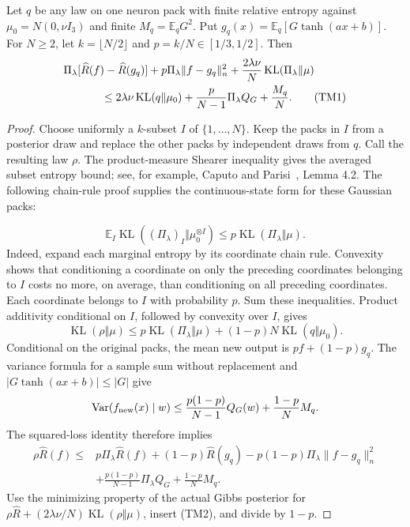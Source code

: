 \begin{lemma}
\label{lem:tanh-subset-midpoint}
Let $q$ be any law on one neuron pack with finite relative entropy
against $\mu_0=N(0,\nu I_3)$ and finite $M_q=\mathbb E_qG^2$.
Put $g_q(x)=\mathbb E_q[G\tanh(ax+b)]$. For $N\ge2$, let
$k=\lfloor N/2\rfloor$ and $p=k/N\in[1/3,1/2]$. Then
\begin{align}
 &\Pi_\lambda[\widehat R(f)-\widehat R(g_q)]
 +p\Pi_\lambda\|f-g_q\|_n^2
 +\frac{2\lambda\nu}{N}\operatorname{KL}(\Pi_\lambda\Vert\mu)
 \nonumber\\
 &\hspace{12mm}\le
 2\lambda\nu\operatorname{KL}(q\Vert\mu_0)
 +\frac{p}{N-1}\Pi_\lambda Q_G+\frac{M_q}{N}.
 \tag{TM1}
\end{align}
\end{lemma}
\begin{proof}
Choose uniformly a $k$-subset $I$ of $\{1,\ldots,N\}$. Keep the
packs in $I$ from a posterior draw and replace the other packs by
independent draws from $q$. Call the resulting law $\rho$.
The product-measure Shearer inequality gives the averaged subset
entropy bound; see, for example, Caputo and Parisi~\cite{entropy-shearer},
Lemma 4.2. The following chain-rule proof supplies the continuous-state
form for these Gaussian packs:

\[
 \mathbb E_I\operatorname{KL}((\Pi_\lambda)_I\Vert\mu_0^{\otimes I})
 \le p\operatorname{KL}(\Pi_\lambda\Vert\mu).
\]
Indeed, expand each marginal entropy by its coordinate chain rule.
Convexity shows that conditioning a coordinate on only the preceding
coordinates belonging to $I$ costs no more, on average, than conditioning
on all preceding coordinates. Each coordinate belongs to $I$ with
probability $p$. Sum these inequalities. Product additivity conditional
on $I$, followed by convexity over $I$, gives
\[
 \operatorname{KL}(\rho\Vert\mu)
 \le p\operatorname{KL}(\Pi_\lambda\Vert\mu)
 +(1-p)N\operatorname{KL}(q\Vert\mu_0).                 \tag{TM2}
\]
Conditional on the original packs, the mean new output is
$pf+(1-p)g_q$. The variance formula for a sample sum without replacement
and $|G\tanh(ax+b)|\le|G|$ give
\[
 \operatorname{Var}(f_{\rm new}(x)\mid w)
 \le \frac{p(1-p)}{N-1}Q_G(w)+\frac{1-p}{N}M_q.
\]
The squared-loss identity therefore implies
\begin{align*}
 \rho\widehat R(f)\le{}&p\Pi_\lambda\widehat R(f)
 +(1-p)\widehat R(g_q)-p(1-p)\Pi_\lambda\|f-g_q\|_n^2\\
 &+\frac{p(1-p)}{N-1}\Pi_\lambda Q_G+\frac{1-p}{N}M_q.
\end{align*}
Use the minimizing property of the actual Gibbs posterior for
$\rho\widehat R+(2\lambda\nu/N)\operatorname{KL}(\rho\Vert\mu)$,
insert (TM2), and divide by $1-p$.
\end{proof}

